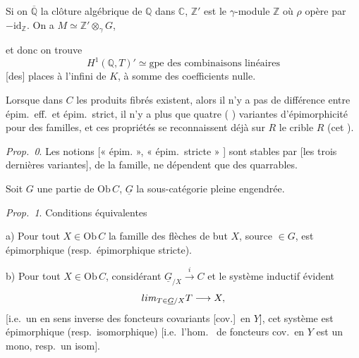 \documentclass[11pt,a4paper]{article}
\begin{document}
Si on  $\overline{\mathbb{Q}}$ la clôture algébrique de
$\mathbb{Q}$ dans $\mathbb{C}$, \ill{} $\mathbb{Z}'$ est le $\gamma$-module
$\mathbb{Z}$ où $\rho$ opère par $-\mathrm{id}_{\mathbb{Z}}$. On a
$M \simeq \mathbb{Z}' \otimes_{\gamma} G$, \ill{}



et donc on trouve
\[
  H^{1}(\mathbb{Q}, T)' \simeq \text{gpe des combinaisons linéaires}
\]
[des] places à l'infini de $K$, à somme des coefficients nulle.

Lorsque  dans $C$ les produits fibrés existent, alors il
n'y a pas de différence entre épim.\ eff.\ et épim.\ strict, il n'y a plus
que quatre ( ) variantes
d'épimorphicité pour des familles, et ces  propriétés se
reconnaissent déjà sur $R$ le crible $R$ (cet \ill{} \ill{} \ill{}).

\emph{Prop.\ 0}. Les  notions 
[« épim. », « épim.\ stricte » \struck{\ill{}}] sont 
stables par \ill{} [les trois dernières variantes], \ill{} de la famille,
\ill{} ne dépendent que des \ill{} quarrables.

Soit $G$ une partie de $\mathrm{Ob}\, C$, $\underline{G}$ la sous-catégorie
pleine engendrée. \struck{\ill{}}

\emph{Prop.\ 1}. Conditions équivalentes

a) Pour tout $X \in \mathrm{Ob}\, C$ la famille des flèches de but $X$,
source $\in G$, est épimorphique (resp.\ épimorphique stricte).

b) Pour tout $X \in \mathrm{Ob}\, C$, considérant $\underline{G}_{/X}
\xrightarrow{\;i\;} C$ et le système inductif évident
\[
  \varinjlim_{T \in \underline{G}/X} T \longrightarrow X ,
\]
[i.e.\ un \ill{} en sens inverse des foncteurs covariants [cov.]\ en $Y$],
cet système est épimorphique \struck{\ill{}} (resp.\ isomorphique) [i.e.\
l'hom.\ \ill{} de foncteurs cov.\ en $Y$ est un mono, resp.\ un isom].
\end{document}
